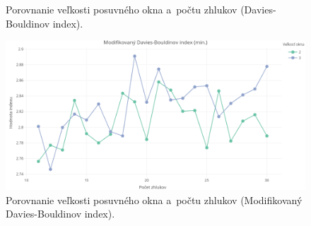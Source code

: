 \documentclass[a4paper,twoside,slovak,12pt,appendix]{article}
\begin{document}
\begin{appendices}
\begin{figure}[htbp]
  \caption{Porovnanie veľkosti posuvného okna a~počtu zhlukov (Davies-Bouldinov index).}
\end{figure}
\begin{figure}[htbp]
  \centering
  \includegraphics[width=\textwidth]{cvi/dtw_basic_workdays_dense/201902271851-DBstar-dtw_basic_workdays_dense.png}
  \caption{Porovnanie veľkosti posuvného okna a~počtu zhlukov (Modifikovaný Davies-Bouldinov index).}
\end{figure}


\end{appendices}
\end{document}
